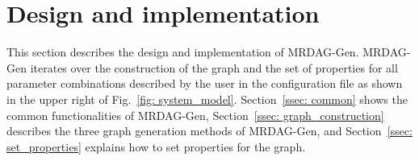\section{Design and implementation}
\label{sec: design_implementation}

This section describes the design and implementation of MRDAG-Gen.
MRDAG-Gen iterates over the construction of the graph and the set of properties for all parameter combinations described by the user in the configuration file as shown in the upper right of Fig.~\ref{fig: system_model}.
Section~\ref{ssec: common} shows the common functionalities of MRDAG-Gen, Section~\ref{ssec: graph_construction} describes the three graph generation methods of MRDAG-Gen, and Section~\ref{ssec: set_properties} explains how to set properties for the graph.



